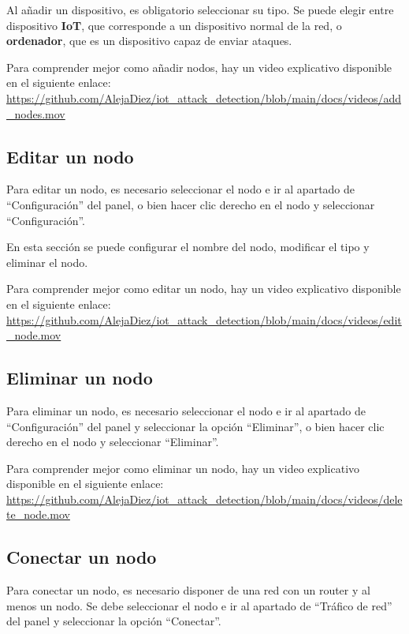 
Al añadir un dispositivo, es obligatorio seleccionar su tipo. Se puede elegir entre dispositivo \textbf{IoT}, que corresponde a un dispositivo normal de la red, o \textbf{ordenador}, que es un dispositivo capaz de enviar ataques.

Para comprender mejor como añadir nodos, hay un video explicativo disponible en el siguiente enlace: \url{https://github.com/AlejaDiez/iot_attack_detection/blob/main/docs/videos/add_nodes.mov}

\subsection{Editar un nodo}
\label{subsec:EditarNodo}
Para editar un nodo, es necesario seleccionar el nodo e ir al apartado de ``Configuración'' del panel, o bien hacer clic derecho en el nodo y seleccionar ``Configuración''.


En esta sección se puede configurar el nombre del nodo, modificar el tipo y eliminar el nodo.

Para comprender mejor como editar un nodo, hay un video explicativo disponible en el siguiente enlace: \url{https://github.com/AlejaDiez/iot_attack_detection/blob/main/docs/videos/edit_node.mov}

\subsection{Eliminar un nodo}
\label{subsec:EliminarNodo}
Para eliminar un nodo, es necesario seleccionar el nodo e ir al apartado de ``Configuración'' del panel y seleccionar la opción ``Eliminar'', o bien hacer clic derecho en el nodo y seleccionar ``Eliminar''.


Para comprender mejor como eliminar un nodo, hay un video explicativo disponible en el siguiente enlace: \url{https://github.com/AlejaDiez/iot_attack_detection/blob/main/docs/videos/delete_node.mov}

\subsection{Conectar un nodo}
\label{subsec:ConectarNodo}
Para conectar un nodo, es necesario disponer de una red con un router y al menos un nodo. Se debe seleccionar el nodo e ir al apartado de ``Tráfico de red'' del panel y seleccionar la opción ``Conectar''.

